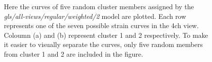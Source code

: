 \clearpage

\begin{figure}[ht]
    \centering
    
    \caption{Here the curves of five random cluster members assigned by the \textit{gls/all-views/regular/weighted/2} model are plotted.
             Each row represents one of the seven possible strain curves in the \acrshort{4ch} view. Coloumn (a) and (b) represent cluster 1 and 2 respectively.
             To make it easier to visually separate the curves, only five random members from cluster 1 and 2 are included in the figure.}
    \label{fig:five_members_gls_rls_4CH_regular_complete_two}
\end{figure}

